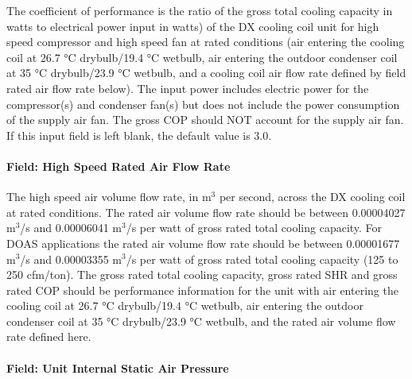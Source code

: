 The coefficient of performance is the ratio of the gross total cooling capacity in watts to electrical power input in watts) of the DX cooling coil unit for high speed compressor and high speed fan at rated conditions (air entering the cooling coil at 26.7 °C drybulb/19.4 °C wetbulb, air entering the outdoor condenser coil at 35 °C drybulb/23.9 °C wetbulb, and a cooling coil air flow rate defined by field rated air flow rate below). The input power includes electric power for the compressor(s) and condenser fan(s) but does not include the power consumption of the supply air fan. The gross COP should NOT account for the supply air fan. If this input field is left blank, the default value is 3.0.

\paragraph{Field: High Speed Rated Air Flow Rate}\label{field-high-speed-rated-air-flow-rate}

The high speed air volume flow rate, in m\(^{3}\) per second, across the DX cooling coil at rated conditions. The rated air volume flow rate should be between 0.00004027 m\(^{3}\)/s and 0.00006041 m\(^{3}\)/s per watt of gross rated total cooling capacity. For DOAS applications the rated air volume flow rate should be between 0.00001677 m\(^{3}\)/s and 0.00003355 m\(^{3}\)/s per watt of gross rated total cooling capacity (125 to 250 cfm/ton). The gross rated total cooling capacity, gross rated SHR and gross rated COP should be performance information for the unit with air entering the cooling coil at 26.7 °C drybulb/19.4 °C wetbulb, air entering the outdoor condenser coil at 35 °C drybulb/23.9 °C wetbulb, and the rated air volume flow rate defined here.

\paragraph{Field: Unit Internal Static Air Pressure}\label{field-unit-internal-static-air-pressure}

